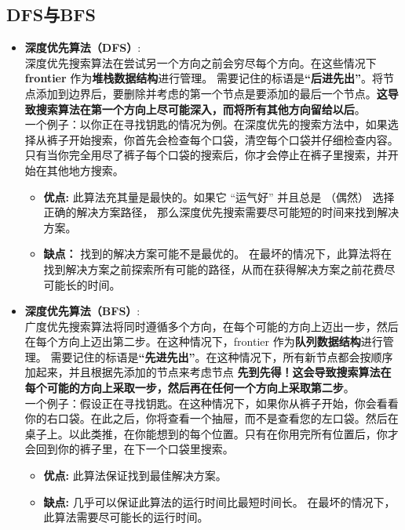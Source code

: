 \subsection{DFS与BFS}
\begin{itemize}
    \item \textbf{深度优先算法（DFS）}:\\
    深度优先搜索算法在尝试另一个方向之前会穷尽每个方向。在这些情况下 \textbf{frontier} 作为\textbf{堆栈数据结构}进行管理。
    需要记住的标语是\textbf{“后进先出”}。将节点添加到边界后，要删除并考虑的第一个节点是要添加的最后一个节点。\textbf{这导致搜索算法在第一个方向上尽可能深入，而将所有其他方向留给以后}。\\
一个例子：以你正在寻找钥匙的情况为例。在深度优先的搜索方法中，如果选择从裤子开始搜索，你首先会检查每个口袋，清空每个口袋并仔细检查内容。只有当你完全用尽了裤子每个口袋的搜索后，你才会停止在裤子里搜索，并开始在其他地方搜索。
\smallskip
    \begin{itemize}
    \item \textbf{优点:}
    此算法充其量是最快的。如果它 “运气好” 并且总是 （偶然） 选择正确的解决方案路径，
    那么深度优先搜索需要尽可能短的时间来找到解决方案。
    \item \textbf{缺点：}
    找到的解决方案可能不是最优的。
    在最坏的情况下，此算法将在找到解决方案之前探索所有可能的路径，从而在获得解决方案之前花费尽可能长的时间。
    \end{itemize}
    \item \textbf{深度优先算法（BFS）}:\\
    广度优先搜索算法将同时遵循多个方向，在每个可能的方向上迈出一步，然后在每个方向上迈出第二步。在这种情况下，frontier 作为\textbf{队列数据结构}进行管理。
    需要记住的标语是\textbf{“先进先出”}。在这种情况下，所有新节点都会按顺序加起来，并且根据先添加的节点来考虑节点
    \textbf{先到先得！这会导致搜索算法在每个可能的方向上采取一步，然后再在任何一个方向上采取第二步}。\\
一个例子：假设正在寻找钥匙。在这种情况下，如果你从裤子开始，你会看看你的右口袋。在此之后，你将查看一个抽屉，而不是查看您的左口袋。然后在桌子上。以此类推，在你能想到的每个位置。只有在你用完所有位置后，你才会回到你的裤子里，在下一个口袋里搜索。
\smallskip    
    \begin{itemize}
        \item \textbf{优点:}
        此算法保证找到最佳解决方案。
        \item \textbf{缺点:}
        几乎可以保证此算法的运行时间比最短时间长。
        在最坏的情况下，此算法需要尽可能长的运行时间。
    \end{itemize}

\end{itemize}
